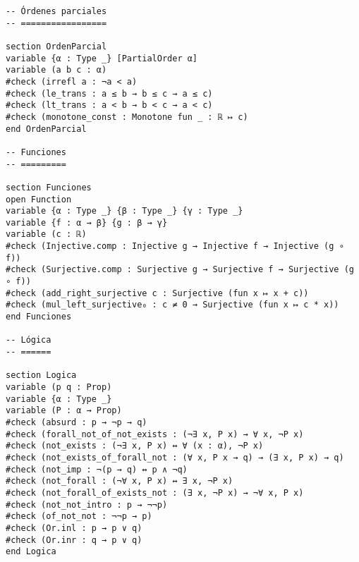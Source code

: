\begin{verbatim}
-- Órdenes parciales
-- =================

section OrdenParcial
variable {α : Type _} [PartialOrder α]
variable (a b c : α)
#check (irrefl a : ¬a < a)
#check (le_trans : a ≤ b → b ≤ c → a ≤ c)
#check (lt_trans : a < b → b < c → a < c)
#check (monotone_const : Monotone fun _ : ℝ ↦ c)
end OrdenParcial

-- Funciones
-- =========

section Funciones
open Function
variable {α : Type _} {β : Type _} {γ : Type _}
variable {f : α → β} {g : β → γ}
variable (c : ℝ)
#check (Injective.comp : Injective g → Injective f → Injective (g ∘ f))
#check (Surjective.comp : Surjective g → Surjective f → Surjective (g ∘ f))
#check (add_right_surjective c : Surjective (fun x ↦ x + c))
#check (mul_left_surjective₀ : c ≠ 0 → Surjective (fun x ↦ c * x))
end Funciones

-- Lógica
-- ======

section Logica
variable (p q : Prop)
variable {α : Type _}
variable (P : α → Prop)
#check (absurd : p → ¬p → q)
#check (forall_not_of_not_exists : (¬∃ x, P x) → ∀ x, ¬P x)
#check (not_exists : (¬∃ x, P x) ↔ ∀ (x : α), ¬P x)
#check (not_exists_of_forall_not : (∀ x, P x → q) → (∃ x, P x) → q)
#check (not_imp : ¬(p → q) ↔ p ∧ ¬q)
#check (not_forall : (¬∀ x, P x) ↔ ∃ x, ¬P x)
#check (not_forall_of_exists_not : (∃ x, ¬P x) → ¬∀ x, P x)
#check (not_not_intro : p → ¬¬p)
#check (of_not_not : ¬¬p → p)
#check (Or.inl : p → p ∨ q)
#check (Or.inr : q → p ∨ q)
end Logica
\end{verbatim}


